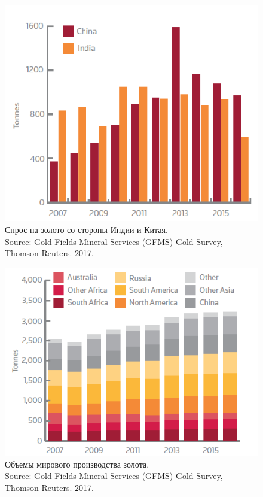 \documentclass[_Banking_p3.tex]{subfiles}
\begin{document}
\begin{frame}[shrink=20]
\begin{figure}	
	\centering
	\includegraphics[scale=0.7]{img/china_india_gold_demand.png}
	\caption{Спрос на золото со стороны Индии и Китая. \\Source: \href{http://financial-risk-solutions.thomsonreuters.info/GFMS}{Gold Fields Mineral Services (GFMS) Gold Survey, Thomson Reuters. 2017.}}
	\label{fig:china_india_gold_demand}
\end{figure}
\end{frame}

\begin{frame}[shrink=20]
\begin{figure}	
	\centering
	\includegraphics[scale=0.8]{img/global_gold_production.png}
	\caption{Объемы мирового производства золота. \\Source: \href{http://financial-risk-solutions.thomsonreuters.info/GFMS}{Gold Fields Mineral Services (GFMS) Gold Survey, Thomson Reuters. 2017.}}
	\label{fig:global_gold_production}
\end{figure}
\end{frame}
\end{document}

